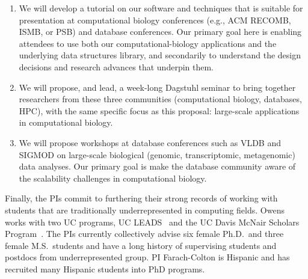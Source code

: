 \begin{enumerate}%
  \item We will develop a tutorial on our software and techniques that is suitable for presentation at computational biology conferences (e.g., ACM RECOMB, ISMB, or PSB) and database conferences. Our primary goal here is enabling attendees to use both our computational-biology applications and the underlying data structures library, and secondarily to understand the design decisions and research advances that underpin them.
  \item We will propose, and lead, a week-long Dagstuhl seminar to bring together researchers from these three communities (computational biology, databases, HPC), with the same specific focus as this proposal: large-scale applications in computational biology.
  \item We will propose workshops at database conferences such as VLDB and SIGMOD on large-scale biological (genomic, transcriptomic, metagenomic) data analyses. Our primary goal is make the database community aware of the scalability challenges in computational biology. 
\end{enumerate}

Finally, the PIs commit to furthering their strong records of working with students that are traditionally underrepresented in computing fields. Owens works with two UC programs, UC LEADS~\cite{UCLeads:2003:WEB} and the UC Davis McNair Scholars Program~\cite{McNair:2003:WEB}.  The PIs currently collectively advise six female Ph.D.\ and three female M.S.\ students and have a long history of supervising students and postdocs from underrepresented group.
PI Farach-Colton is Hispanic and has recruited many Hispanic students into PhD programs.

